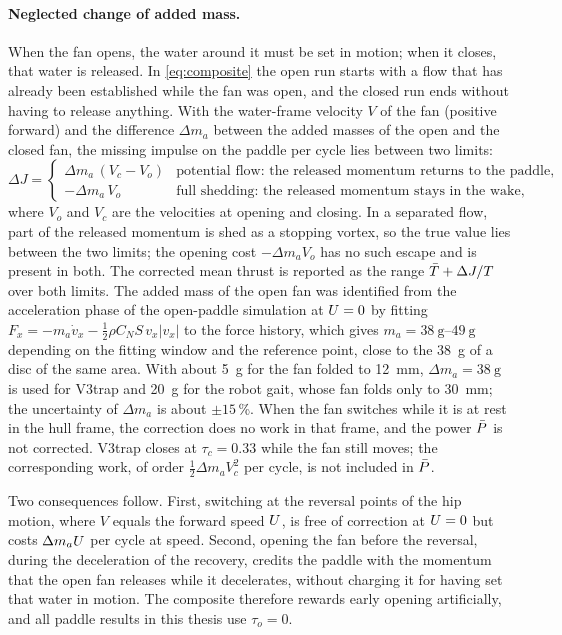 \paragraph{Neglected change of added mass.} When the fan opens, the water around it must be set in motion; when it
closes, that water is released. In \eqref{eq:composite} the open run starts with a flow that has already been
established while the fan was open, and the closed run ends without having to release anything. With the
water-frame velocity $V$ of the fan (positive forward) and the difference $\Delta m_a$ between the added masses of the
open and the closed fan, the missing impulse on the paddle per cycle lies between two limits:
\begin{equation}
  \Delta J = \begin{cases}
    \Delta m_a\,(V_c - V_o) & \text{potential flow: the released momentum returns to the paddle,}\\
    -\Delta m_a\,V_o & \text{full shedding: the released momentum stays in the wake,}
  \end{cases}
  \label{eq:addedmass}
\end{equation}
where $V_o$ and $V_c$ are the velocities at opening and closing. In a separated flow, part of the released momentum is
shed as a stopping vortex, so the true value lies between the two limits; the opening cost $-\Delta m_a V_o$ has no such
escape and is present in both. The corrected mean thrust is reported as the range
$\bar{T}+\Delta J/T$ over both limits. The added mass of the open fan was identified from the acceleration phase of the
open-paddle simulation at $U=0$ by fitting $F_x=-m_a\dot v_x-\tfrac12\rho C_N S\,v_x|v_x|$ to the force history, which gives
$m_a=\SIrange{38}{49}{\gram}$ depending on the fitting window and the reference point, close to the
\SI{38}{\gram} of a disc of the same area. With about \SI{5}{\gram} for the fan folded to \SI{12}{\milli\metre},
$\Delta m_a=\SI{38}{\gram}$ is used for V3trap and \SI{20}{\gram} for the robot gait, whose fan folds only to
\SI{30}{\milli\metre}; the uncertainty of $\Delta m_a$ is about $\pm15$\,\%. When the fan switches while it is at rest in the hull frame, the correction does no work in that frame, and the power $\bar{P}$ is not corrected. V3trap closes at $\tau_c=0.33$ while the fan still moves; the corresponding work, of order $\tfrac12\Delta m_a V_c^2$ per cycle, is not included in $\bar{P}$.

Two consequences follow. First, switching at the reversal points of the hip motion, where $V$ equals the forward speed
$U$, is free of correction at $U=0$ but costs $\Delta m_aU$ per cycle at speed. Second, opening the fan before the reversal,
during the deceleration of the recovery, credits the paddle with the momentum that the open fan releases while it
decelerates, without charging it for having set that water in motion. The composite therefore rewards early opening
artificially, and all paddle results in this thesis use $\tau_o=0$.

